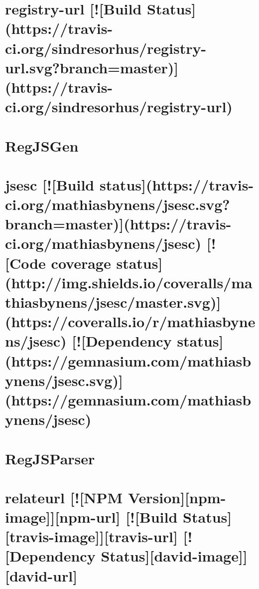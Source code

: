 \documentclass[twoside]{book}
\newcommand{\+}{\discretionary{\mbox{\scriptsize$\hookleftarrow$}}{}{}}
\begin{document}
\chapter{registry-\/url \mbox{[}!\mbox{[}Build Status\mbox{]}(https\+://travis-\/ci.org/sindresorhus/registry-\/url.svg?branch=master)\mbox{]}(https\+://travis-\/ci.org/sindresorhus/registry-\/url)}
\label{md__c_1_workspace_demo_src_main_script_node_modules_registry-url_readme}

\chapter{Reg\+J\+S\+Gen}
\label{md__c_1_workspace_demo_src_main_script_node_modules_regjsgen__r_e_a_d_m_e}

\chapter{jsesc \mbox{[}!\mbox{[}Build status\mbox{]}(https\+://travis-\/ci.org/mathiasbynens/jsesc.svg?branch=master)\mbox{]}(https\+://travis-\/ci.org/mathiasbynens/jsesc) \mbox{[}!\mbox{[}Code coverage status\mbox{]}(http\+://img.shields.\+io/coveralls/mathiasbynens/jsesc/master.svg)\mbox{]}(https\+://coveralls.io/r/mathiasbynens/jsesc) \mbox{[}!\mbox{[}Dependency status\mbox{]}(https\+://gemnasium.com/mathiasbynens/jsesc.svg)\mbox{]}(https\+://gemnasium.com/mathiasbynens/jsesc)}
\label{md__c_1_workspace_demo_src_main_script_node_modules_regjsparser_node_modules_jsesc__r_e_a_d_m_e}

\chapter{Reg\+J\+S\+Parser}
\label{md__c_1_workspace_demo_src_main_script_node_modules_regjsparser__r_e_a_d_m_e}

\chapter{relateurl \mbox{[}!\mbox{[}N\+PM Version\mbox{]}\mbox{[}npm-\/image\mbox{]}\mbox{]}\mbox{[}npm-\/url\mbox{]} \mbox{[}!\mbox{[}Build Status\mbox{]}\mbox{[}travis-\/image\mbox{]}\mbox{]}\mbox{[}travis-\/url\mbox{]} \mbox{[}!\mbox{[}Dependency Status\mbox{]}\mbox{[}david-\/image\mbox{]}\mbox{]}\mbox{[}david-\/url\mbox{]}}
\label{md__c_1_workspace_demo_src_main_script_node_modules_relateurl__r_e_a_d_m_e}

\end{document}
